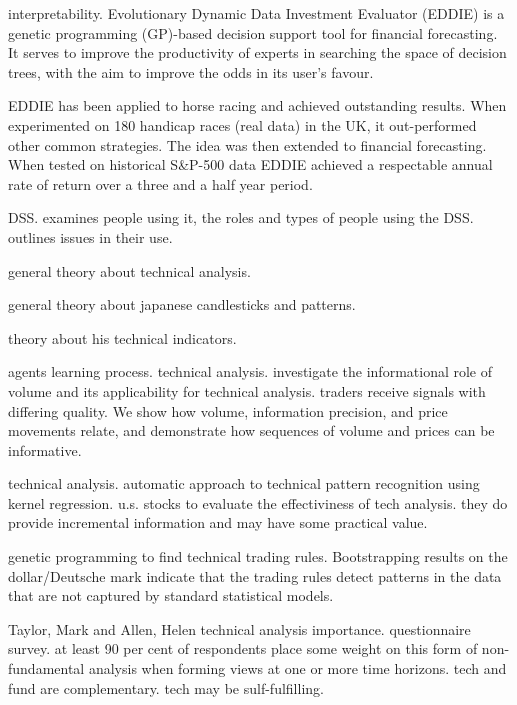 \cite{Tsang2004} interpretability. Evolutionary Dynamic Data Investment
Evaluator (EDDIE) is a genetic programming (GP)-based decision support tool for
financial forecasting. It serves to improve the productivity of experts in
searching the space of decision trees, with the aim to improve the odds in its user’s favour.


\cite{tsang1998eddie} EDDIE has been applied to horse racing and achieved outstanding
results. When experimented on 180 handicap races (real data) in the UK, it
out-performed other common strategies. The idea was then extended to financial forecasting. When tested on
historical S&P-500 data EDDIE achieved a respectable annual rate of return over
a three and a half year period.

\cite{Sprague1980} DSS. examines people using it, the roles and types of people using the
DSS. outlines issues in their use.

\cite{Achelis2000} general theory about technical analysis.

\cite{Nison1991} general theory about japanese candlesticks and patterns.

\cite{Wilder1978} theory about his technical indicators.

\cite{Blume1994} agents learning process. technical analysis. investigate the informational role
of volume and its applicability for technical analysis. traders receive signals
with differing quality. We show how volume, information precision, and price
movements relate, and demonstrate how sequences of volume and prices can be
informative.

\cite{Lo2000} technical analysis. automatic approach to technical pattern recognition using
kernel regression. u.s. stocks to evaluate the effectiviness of tech
analysis. they do provide incremental information and may have some practical value.

\cite{Neely1997} genetic programming to find technical trading rules. Bootstrapping
results on the dollar/Deutsche mark indicate that the trading rules detect
patterns in the data that are not captured by standard statistical models.

Taylor, Mark and Allen, Helen \cite{Fund1992} technical analysis
importance. questionnaire survey. at least 90 per cent of respondents place some
weight on this form of non-fundamental analysis when forming views at one or
more time horizons. tech and fund are complementary. tech may be sulf-fulfilling.


